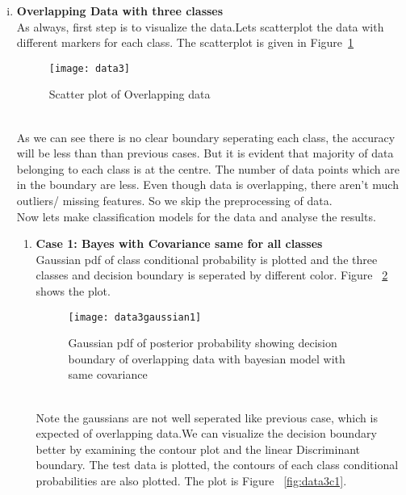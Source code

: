 \documentclass[11pt,paper=a4,answers]{exam}
\begin{document}
\begin{questions}
\begin{enumerate}[i.]
    \item \textbf{Overlapping Data with three classes}\\
        As always, first step is to visualize the data.Lets scatterplot the data with different markers for each class. The scatterplot is given in Figure~\ref{fig:scatterData3}
        \begin{figure}[ht]
            \centering
            \texttt{[image: data3]}
            \vspace{-30pt}
            \caption{Scatter plot of Overlapping data}
            \label{fig:scatterData3}
        \end{figure}\\
        As we can see there is no clear boundary seperating each class, the accuracy will be less than than previous cases. But it is evident that majority of data belonging to each class is at the centre. The number of data points which are in the boundary are less. Even though data is overlapping, there aren't much outliers/ missing features. So we skip the preprocessing of data.\\
        Now lets make classification models for the data and analyse the results.
        \begin{enumerate}
            \item \textbf{Case 1: Bayes with Covariance same for all classes}\\
            Gaussian pdf of class conditional probability is plotted and the three classes and decision boundary is seperated by different color. Figure ~\ref{fig:data3g1} shows the plot.\\
            \begin{figure}[ht]
                \centering
                \texttt{[image: data3gaussian1]}
                \vspace{-30pt}
                \caption{Gaussian pdf of posterior probability showing decision boundary of overlapping data with bayesian model with same covariance}
                \label{fig:data3g1}
            \end{figure}\\
            Note the gaussians are not well seperated like previous case, which is expected of overlapping data.We can visualize the decision boundary better by examining the contour plot and the linear Discriminant boundary. The test data is plotted, the contours of each class conditional probabilities are also plotted. The plot is Figure ~\ref{fig:data3c1}.\\ 

\end{enumerate}
\end{enumerate}
\end{questions}
\end{document}
